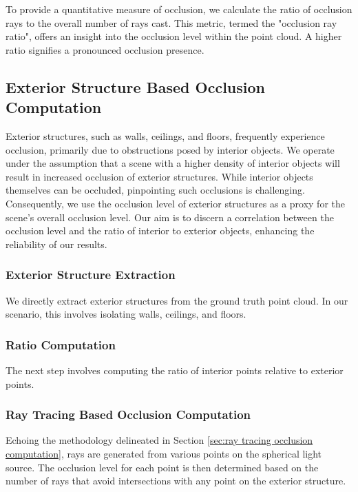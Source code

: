 \documentclass[11pt, a4paper,oneside,chapterprefix=false]{scrbook}
\begin{document}
\vspace{10pt}

To provide a quantitative measure of occlusion, we calculate the ratio of occlusion rays to the overall number of rays cast. This metric, termed the "occlusion ray ratio", offers an insight into the occlusion level within the point cloud. A higher ratio signifies a pronounced occlusion presence.

\subsection{Exterior Structure Based Occlusion Computation} \label{sec:exterior structure occlusion computation}

Exterior structures, such as walls, ceilings, and floors, frequently experience occlusion, primarily due to obstructions posed by interior objects. We operate under the assumption that a scene with a higher density of interior objects will result in increased occlusion of exterior structures. While interior objects themselves can be occluded, pinpointing such occlusions is challenging. Consequently, we use the occlusion level of exterior structures as a proxy for the scene's overall occlusion level. Our aim is to discern a correlation between the occlusion level and the ratio of interior to exterior objects, enhancing the reliability of our results.

\subsubsection{Exterior Structure Extraction}

We directly extract exterior structures from the ground truth point cloud. In our scenario, this involves isolating walls, ceilings, and floors.

\subsubsection{Ratio Computation}

The next step involves computing the ratio of interior points relative to exterior points.

\subsubsection{Ray Tracing Based Occlusion Computation}

Echoing the methodology delineated in Section \ref{sec:ray tracing occlusion computation}, rays are generated from various points on the spherical light source. The occlusion level for each point is then determined based on the number of rays that avoid intersections with any point on the exterior structure.
\end{document}
